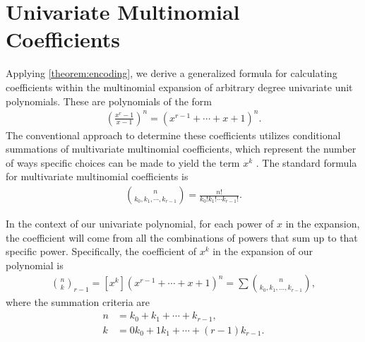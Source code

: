 \documentclass[10pt,a4paper]{article}
\theoremstyle{plain}
\begin{document}
\section{Univariate Multinomial Coefficients} \label{section:multinomialformula}
Applying \cref{theorem:encoding}, we derive a generalized formula for calculating coefficients within the multinomial expansion of arbitrary degree univariate unit polynomials. These are polynomials of the form
\begin{align*}
    \left(\frac{x^{r}-1}{x-1}\right)^n = (x^{r-1} + \cdots + x + 1)^n  .
\end{align*}
The conventional approach to determine these coefficients utilizes conditional summations of multivariate multinomial coefficients, which represent the number of ways specific choices can be made to yield the term \(x^k\) \cite{graham1994concrete}. The standard formula for multivariate multinomial coefficients is
\begin{align*}
    \binom{n}{k_0, k_1, \cdots, k_{r-1}} = \frac{n!}{k_0! k_1! \cdots k_{r-1}!} .
\end{align*}

In the context of our univariate polynomial, for each power of \(x\) in the expansion, the coefficient will come from all the combinations of powers that sum up to that specific power. Specifically, the coefficient of \(x^k\) in the expansion of our polynomial is \cite{brualdi2010intro}
\begin{align*}
    \binom{n}{k}_{r-1} = [x^k](x^{r-1} + \cdots + x + 1)^n = \sum \binom{n}{k_0, k_1, \ldots, k_{r-1}} ,
\end{align*}
where the summation criteria are
\begin{align*}
    n &= k_0 + k_1 + \cdots + k_{r-1},
    \\
    k &= 0 k_0 + 1 k_1 + \cdots + (r-1) k_{r-1}.
\end{align*}
\end{document}
